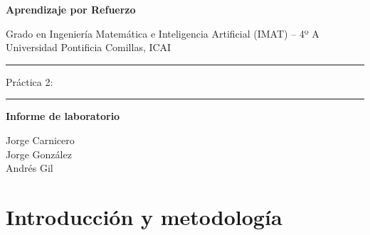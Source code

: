 \documentclass[11pt,a4paper]{article}
\begin{document}
\begin{titlepage}\centering

{\large\bfseries Aprendizaje por Refuerzo\par}\vspace{2mm}

Grado en Ingeniería Matemática e Inteligencia Artificial (IMAT) -- 4º A\\ Universidad Pontificia Comillas, ICAI\par

\vspace{2.2cm}\rule{\textwidth}{0.6pt}\par\vspace{4mm}

{\LARGE Práctica 2:\par}\vspace{2mm}{\Large\bfseries RL tabular sin modelo:\\ SARSA y Q-learning\par}

\vspace{4mm}\rule{\textwidth}{0.6pt}\par\vspace{2cm}

{\large\bfseries Informe de laboratorio\par}\vspace{2cm}

Jorge Carnicero\\ Jorge González\\ Andrés Gil\par\vspace{1cm}

\vfill



\newpage

\begin{minipage}{0.92\textwidth}\small\tableofcontents\end{minipage}

\end{titlepage}




\newpage

\section{Introducción y metodología}
\end{document}
